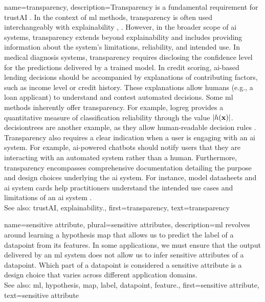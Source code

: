 {name={transparency},
	description={Transparency is a fundamental requirement for 
		\gls{trustAI} \cite{HLEGTrustworhtyAI}. In the context of \gls{ml} 
		methods, transparency is often used interchangeably with \gls{explainability} 
		\cite{JunXML2020}, \cite{gallese2023ai}. However, in the broader scope of \gls{ai} 
		systems, transparency extends beyond \gls{explainability} and includes providing information 
		about the system’s limitations, reliability, and intended use. 
		In medical diagnosis systems, transparency requires disclosing the confidence level 
		for the \glspl{prediction} delivered by a trained \gls{model}. In credit scoring, 
		\gls{ai}-based lending decisions should be accompanied by explanations of 
		contributing factors, such as income level or credit history. These explanations 
		allow humans (e.g., a loan applicant) to understand and contest automated decisions. 
		Some \gls{ml} methods inherently offer transparency. For example, \gls{logreg} 
		provides a quantitative measure of \gls{classification} reliability through the value $|h({\bf x})|$. 
		\Glspl{decisiontree} are another example, as they allow human-readable decision rules \cite{rudin2019stop}.
		Transparency also requires a clear indication when a user is engaging with an \gls{ai} system. 
		For example, \gls{ai}-powered chatbots should notify users that they are interacting with an 
		automated system rather than a human. Furthermore, transparency encompasses comprehensive 
		documentation detailing the purpose and design choices underlying the \gls{ai} system. 
		For instance, \gls{model} datasheets \cite{DatasheetData2021} and \gls{ai} system cards \cite{10.1145/3287560.3287596} 
		help practitioners understand the intended use cases and limitations of an \gls{ai} system \cite{Shahriari2017}.
					\\ 
		See also: \gls{trustAI}, \gls{explainability}.},
	first={transparency}, 
	text={transparency} 
}



{name={sensitive attribute}, plural={sensitive attributes},
	description={\gls{ml} revolves around learning a \gls{hypothesis} \gls{map} that allows 
		us to predict the \gls{label} of a \gls{datapoint} from its \glspl{feature}. In some 
		applications, we must ensure that the output delivered by an \gls{ml} system does 
		not allow us to infer sensitive attributes of a \gls{datapoint}. Which part 
		of a \gls{datapoint} is considered a sensitive attribute is a design 
		choice that varies across different application domains.
					\\ 
		See also: \gls{ml}, \gls{hypothesis}, \gls{map}, \gls{label}, \gls{datapoint}, \gls{feature}.},
	first={sensitive attribute},
	text={sensitive attribute} 
}


